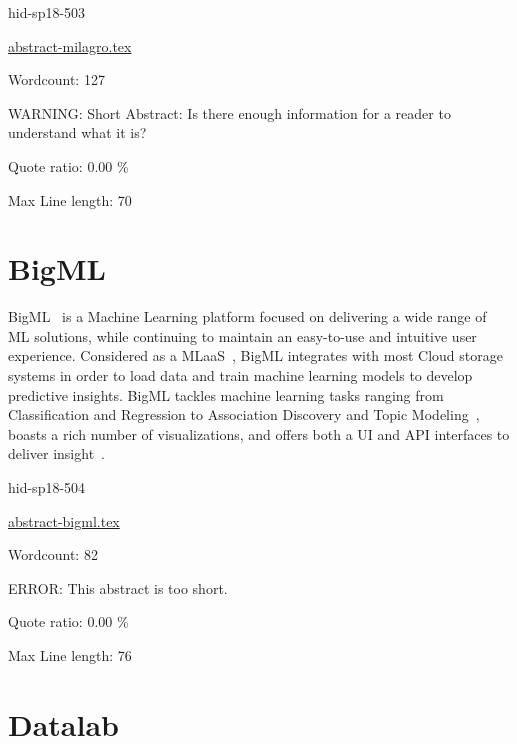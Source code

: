 \begin{IU}

hid-sp18-503

\href{https://github.com/cloudmesh-community/hid-sp18-503/blob/master//technology/abstract-milagro.tex}{abstract-milagro.tex}

 

Wordcount: 127

WARNING: Short Abstract: Is there enough information for a reader to understand what it is?


Quote ratio: 0.00 \%
 
Max Line length: 70
\end{IU}

\section{BigML}

BigML~\cite{hid-sp18-504-cloudacad-bigml} is a Machine Learning platform
focused on delivering a wide range of ML solutions, while continuing to 
maintain an easy-to-use and intuitive user experience. Considered as 
a MLaaS~\cite{hid-sp18-504-cloudacad-bigml}, BigML integrates with most 
Cloud storage systems in order to load data and train machine learning 
models to develop predictive insights. BigML tackles machine learning tasks 
ranging from Classification and Regression to Association Discovery and 
Topic Modeling~\cite{hid-sp18-504-bigml}, boasts a rich number of 
visualizations, and offers both a UI and API interfaces to deliver 
insight~\cite{hid-sp18-504-cloudacad-bigml}.


\begin{IU}

hid-sp18-504

\href{https://github.com/cloudmesh-community/hid-sp18-504/blob/master//technology/abstract-bigml.tex}{abstract-bigml.tex}

 

Wordcount: 82

ERROR: This abstract is too short.


Quote ratio: 0.00 \%
 
Max Line length: 76
\end{IU}

\section{Datalab}

